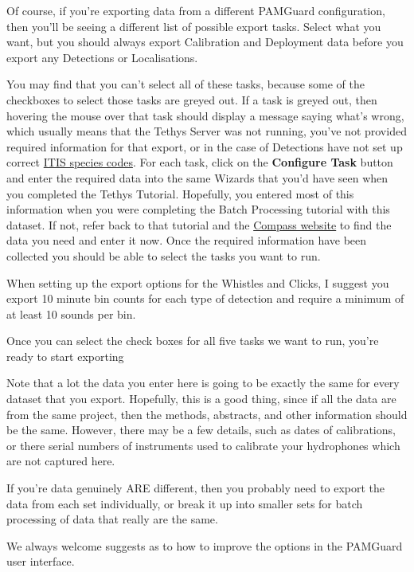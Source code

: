 \documentclass[
]{article}
\begin{document}
Of course, if you're exporting data from a different PAMGuard
configuration, then you'll be seeing a different list of possible export
tasks. Select what you want, but you should always export Calibration
and Deployment data before you export any Detections or Localisations.

You may find that you can't select all of these tasks, because some of
the checkboxes to select those tasks are greyed out. If a task is greyed
out, then hovering the mouse over that task should display a message
saying what's wrong, which usually means that the Tethys Server was not
running, you've not provided required information for that export, or in
the case of Detections have not set up correct
\href{https://www.pamguard.org/olhelp/utilities/tethys/docs/tethys_speciescodes.html}{ITIS
species codes}. For each task, click on the \textbf{Configure Task}
button and enter the required data into the same Wizards that you'd have
seen when you completed the Tethys Tutorial. Hopefully, you entered most
of this information when you were completing the Batch Processing
tutorial with this dataset. If not, refer back to that tutorial and the
\href{https://www.sams.ac.uk/science/projects/compass/}{Compass website}
to find the data you need and enter it now. Once the required
information have been collected you should be able to select the tasks
you want to run.

When setting up the export options for the Whistles and Clicks, I
suggest you export 10 minute bin counts for each type of detection and
require a minimum of at least 10 sounds per bin.

Once you can select the check boxes for all five tasks we want to run,
you're ready to start exporting

\begin{tcolorbox}[enhanced jigsaw, arc=.35mm, title=\textcolor{quarto-callout-note-color}{\faInfo}\hspace{0.5em}{Configuration Differences}, opacitybacktitle=0.6, colbacktitle=quarto-callout-note-color!10!white, colframe=quarto-callout-note-color-frame, colback=white, toprule=.15mm, rightrule=.15mm, bottomtitle=1mm, opacityback=0, breakable, toptitle=1mm, coltitle=black, left=2mm, bottomrule=.15mm, leftrule=.75mm, titlerule=0mm]

Note that a lot the data you enter here is going to be exactly the same
for every dataset that you export. Hopefully, this is a good thing,
since if all the data are from the same project, then the methods,
abstracts, and other information should be the same. However, there may
be a few details, such as dates of calibrations, or there serial numbers
of instruments used to calibrate your hydrophones which are not captured
here.

If you're data genuinely ARE different, then you probably need to export
the data from each set individually, or break it up into smaller sets
for batch processing of data that really are the same.

We always welcome suggests as to how to improve the options in the
PAMGuard user interface.

\end{tcolorbox}
\end{document}
